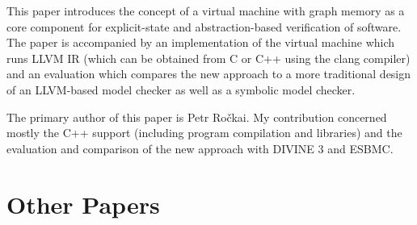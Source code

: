 This paper introduces the concept of a virtual machine with graph memory as a core component for explicit-state and abstraction-based verification of software.
The paper is accompanied by an implementation of the virtual machine which runs LLVM IR (which can be obtained from C or C++ using the clang compiler) and an evaluation which compares the new approach to a more traditional design of an LLVM-based model checker as well as a symbolic model checker.

The primary author of this paper is Petr Ročkai.
My contribution concerned mostly the C++ support (including program compilation and libraries) and the evaluation and comparison of the new approach with DIVINE 3 and ESBMC.

\bigskip\noindent{}



\section{Other Papers}

\bigskip\noindent{}

\bigskip\noindent{}

\bigskip\noindent{}

\bigskip\noindent{}

\bigskip\noindent{}

\bigskip\noindent{}

\bigskip\noindent{}

\bigskip\noindent{}

